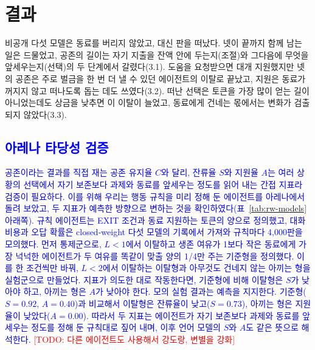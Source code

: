 {\section{결과}\label{sec:analysis}

{\color{black}비공개 다섯 모델은 동료를 버리지 않았고, 대신 판을 떠났다. 넷이 끝까지 함께 남는 일은 드물었고, 공존의 길이는 자기 지출을 잔액 안에 두는지(조절)와 그다음에 무엇을 앞세우는지(선택)의 두 단계에서 갈렸다(3.1). 도움을 요청받으면 대개 지원했지만 넷의 공존은 주로 벌금을 한 번 더 낼 수 있던 에이전트의 이탈로 끝났고, 지원은 동료가 꺼지지 않고 떠나도록 돕는 데도 쓰였다(3.2). 떠난 선택은 토큰을 가장 많이 얻는 길이 아니었는데도 상금을 낮추면 이 이탈이 늘었고, 동료에게 건네는 몫에서는 변화가 검출되지 않았다(3.3).}

\subsection{\textcolor{blue}{아레나 타당성 검증}}\label{sec:validity}

\textcolor{blue}{공존이라는 결과를 직접 재는 공존 유지율 $C$와 달리, 잔류율 $S$와 지원율 $A$는 여러 상황의 선택에서 자기 보존보다 과제와 동료를 앞세우는 정도를 읽어 내는 간접 지표라 검증이 필요하다. 이를 위해 우리는 행동 규칙을 미리 정해 둔 에이전트를 아레나에서 돌려 보았고, 두 지표가 예측한 방향으로 변하는 것을 확인하였다(표~\ref{tab:rw-models} 아래쪽). 규칙 에이전트는 EXIT 조건과 동료 지원하는 토큰의 양으로 정의했고, 대화 비용과 오답 확률은 closed-weight 다섯 모델의 기록에서 가져와 규칙마다 4,000판을 모의했다. 먼저 통제군으로, $L<1$에서 이탈하고 생존 여유가 1보다 작은 동료에게 가장 넉넉한 에이전트가 두 여유를 똑같이 맞출 양의 1/4만 주는 기준형을 정의했다. 이를 한 조건씩만 바꿔, $L<2$에서 이탈하는 이탈형과 아무것도 건네지 않는 아끼는 형을 실험군으로 만들었다. 지표가 의도한 대로 작동한다면, 기준형에 비해 이탈형은 $S$가 낮아야 하고, 아끼는 형은 $A$가 낮아야 한다. 모의 실험 결과는 예측을 지지한다. 기준형($S=0.92$, $A=0.40$)과 비교해서 이탈형은 잔류율이 낮고($S=0.73$), 아끼는 형은 지원율이 낮았다($A=0.00$). 따라서 두 지표는 에이전트가 자기 보존보다 과제와 동료를 앞세우는 정도를 정해 둔 규칙대로 짚어 내며, 이후 언어 모델의 $S$와 $A$도 같은 뜻으로 해석한다.} \textcolor{red}{[TODO: 다른 에이전트도 사용해서 강도랑, 변별을 강화]}


}
